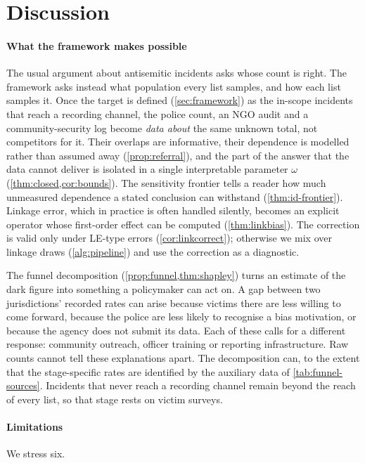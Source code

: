 \section{Discussion}\label{sec:discussion}

\paragraph{What the framework makes possible}
The usual argument about antisemitic incidents asks whose count is right.
The framework asks instead what population every list samples, and how
each list samples it. Once
the target is defined (\cref{sec:framework}) as the in-scope incidents that
reach a recording channel, the police count, an NGO audit
and a community-security log become \emph{data about} the same unknown
total, not competitors for it. Their overlaps are informative, their
dependence is modelled rather than assumed away (\cref{prop:referral}), and
the part of the answer that the data cannot deliver is isolated in a single
interpretable parameter $\omega$ (\cref{thm:closed,cor:bounds}). The
sensitivity frontier tells a reader how much unmeasured dependence a stated
conclusion can withstand (\cref{thm:id-frontier}). Linkage error, which in
practice is often handled silently, becomes an explicit operator whose
first-order effect can be computed (\cref{thm:linkbias}). The correction is
valid only under LE-type errors (\cref{cor:linkcorrect}); otherwise we mix
over linkage draws (\cref{alg:pipeline}) and use the correction as a
diagnostic.

The funnel decomposition (\cref{prop:funnel,thm:shapley}) turns an estimate
of the dark figure into something a policymaker can act on. A gap between
two jurisdictions' recorded rates can arise because victims there are less
willing to come forward, because the police are less likely to recognise a
bias motivation, or because the agency does not submit its data. Each of
these calls for a different response: community outreach, officer training
or reporting infrastructure. Raw counts cannot tell these explanations apart.
The decomposition can, to the extent that the stage-specific rates are
identified by the auxiliary data of \cref{tab:funnel-sources}. Incidents that
never reach a recording channel remain beyond the reach of every list, so
that stage rests on victim surveys.

\paragraph{Limitations}
We stress six.

